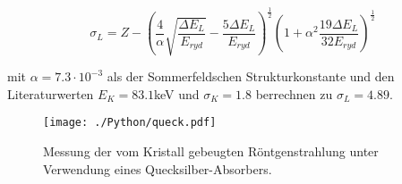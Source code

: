 \begin{equation}
  \sigma_L = Z - \left(\frac{4}{\alpha}\sqrt{\frac{\Delta E_L}{E_{ryd}}}-\frac{5\Delta E_L}{E_{ryd}}\right)^{\frac{1}{2}} \left(1+\alpha^2   \frac{19\Delta E_L}{32 E_{ryd}}\right)^{\frac{1}{2}}
\end{equation}

mit $\alpha = 7.3 \cdot 10^{-3}$ als der Sommerfeldschen Strukturkonstante und den Literaturwerten $E_K = 83.1$keV \cite{skuld} und $\sigma_K = 1.8$ berrechnen zu $\sigma_L = 4.89$.

\begin{figure}
  \centering
  \texttt{[image: ./Python/queck.pdf]}
  \caption{Messung der vom Kristall gebeugten Röntgenstrahlung unter Verwendung eines Quecksilber-Absorbers.}
  \label{fig:queck}
\end{figure}
